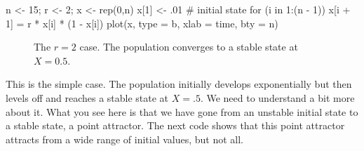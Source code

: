 \documentclass[
  a4paper,
  DIV=11,
  numbers=noendperiod,
  oneside]{scrreprt}
\newenvironment{Shaded}{}{}
\newcommand{\AttributeTok}[1]{\textcolor[rgb]{0.84,0.23,0.29}{#1}}
\newcommand{\CommentTok}[1]{\textcolor[rgb]{0.42,0.45,0.49}{#1}}
\newcommand{\ControlFlowTok}[1]{\textcolor[rgb]{0.84,0.23,0.29}{#1}}
\newcommand{\DecValTok}[1]{\textcolor[rgb]{0.00,0.36,0.77}{#1}}
\newcommand{\FunctionTok}[1]{\textcolor[rgb]{0.44,0.26,0.76}{#1}}
\newcommand{\NormalTok}[1]{\textcolor[rgb]{0.14,0.16,0.18}{#1}}
\newcommand{\OtherTok}[1]{\textcolor[rgb]{0.44,0.26,0.76}{#1}}
\newcommand{\SpecialCharTok}[1]{\textcolor[rgb]{0.00,0.36,0.77}{#1}}
\newcommand{\StringTok}[1]{\textcolor[rgb]{0.01,0.18,0.38}{#1}}
\begin{document}
\begin{Shaded}
\begin{Highlighting}[]
\NormalTok{n }\OtherTok{\textless{}{-}} \DecValTok{15}\NormalTok{; r }\OtherTok{\textless{}{-}} \DecValTok{2}\NormalTok{; x }\OtherTok{\textless{}{-}} \FunctionTok{rep}\NormalTok{(}\DecValTok{0}\NormalTok{,n)}
\NormalTok{x[}\DecValTok{1}\NormalTok{] }\OtherTok{\textless{}{-}}\NormalTok{ .}\DecValTok{01} \CommentTok{\# initial state}
\ControlFlowTok{for}\NormalTok{ (i }\ControlFlowTok{in} \DecValTok{1}\SpecialCharTok{:}\NormalTok{(n }\SpecialCharTok{{-}} \DecValTok{1}\NormalTok{))}
\NormalTok{  x[i }\SpecialCharTok{+} \DecValTok{1}\NormalTok{] }\OtherTok{=}\NormalTok{ r }\SpecialCharTok{*}\NormalTok{ x[i] }\SpecialCharTok{*}\NormalTok{ (}\DecValTok{1} \SpecialCharTok{{-}}\NormalTok{ x[i])}
\FunctionTok{plot}\NormalTok{(x, }\AttributeTok{type =} \StringTok{\textquotesingle{}b\textquotesingle{}}\NormalTok{, }\AttributeTok{xlab =} \StringTok{\textquotesingle{}time\textquotesingle{}}\NormalTok{, }\AttributeTok{bty =} \StringTok{\textquotesingle{}n\textquotesingle{}}\NormalTok{)}
\end{Highlighting}
\end{Shaded}

\begin{figure}


\caption{\label{fig-ch2-img2}The \(r=2\) case. The population converges
to a stable state at \(X=0.5\).}

\end{figure}%

This is the simple case. The population initially develops exponentially
but then levels off and reaches a stable state at \(X = .5\). We need to
understand a bit more about it. What you see here is that we have gone
from an unstable initial state to a stable state, a point attractor. The
next code shows that this point attractor attracts from a wide range of
initial values, but not all.
\end{document}
